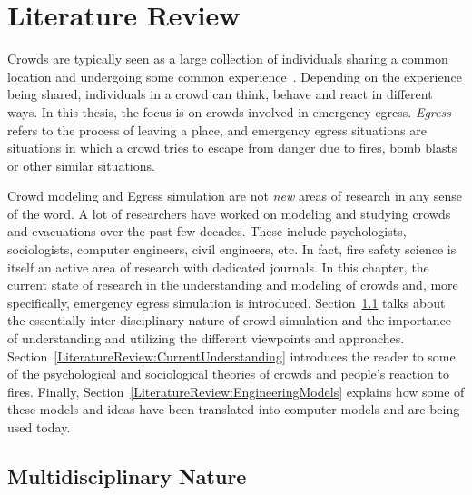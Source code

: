
\chapter{Literature Review}
\label{chapter:LiteratureReview}

Crowds are typically seen as a large collection of individuals sharing a common location and undergoing some common experience~\cite{Aveni:1997wq}. Depending on the experience being shared, individuals in a crowd can think, behave and react in different ways. In this thesis, the focus is on crowds involved in emergency egress. \emph{Egress} refers to the process of leaving a place, and emergency egress situations are situations in which a crowd tries to escape from danger due to fires, bomb blasts or other similar situations.

Crowd modeling and Egress simulation are not \emph{new} areas of research in any sense of the word. A lot of researchers have worked on modeling and studying crowds and evacuations over the past few decades. These include psychologists, sociologists, computer engineers, civil engineers, etc. In fact, fire safety science is itself an active area of research with dedicated journals. In this chapter, the current state of research in the understanding and modeling of crowds and, more specifically, emergency egress simulation is introduced. Section~\ref{LiteratureReiew:MultidisciplinaryNature} talks about the essentially inter-disciplinary nature of crowd simulation and the importance of understanding and utilizing the different viewpoints and approaches. Section~\ref{LiteratureReview:CurrentUnderstanding} introduces the reader to some of the psychological and sociological theories of crowds and people's reaction to fires. Finally, Section~\ref{LiteratureReview:EngineeringModels} explains how some of these models and ideas have been translated into computer models and are being used today.

\section{Multidisciplinary Nature}
\label{LiteratureReiew:MultidisciplinaryNature}

